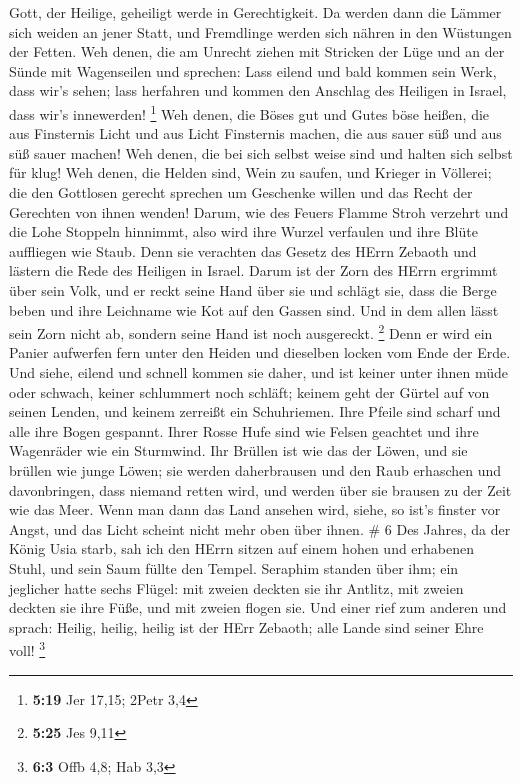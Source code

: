 Gott, der Heilige, geheiligt werde in Gerechtigkeit.  Da
werden dann die Lämmer sich weiden an jener Statt, und Fremdlinge werden
sich nähren in den Wüstungen der Fetten.  Weh denen, die am
Unrecht ziehen mit Stricken der Lüge und an der Sünde mit Wagenseilen
 und sprechen: Lass eilend und bald kommen sein Werk, dass
wir's sehen; lass herfahren und kommen den Anschlag des Heiligen in
Israel, dass wir's innewerden! \footnote{\textbf{5:19} Jer 17,15; 2Petr
  3,4}  Weh denen, die Böses gut und Gutes böse heißen, die
aus Finsternis Licht und aus Licht Finsternis machen, die aus sauer süß
und aus süß sauer machen!  Weh denen, die bei sich selbst
weise sind und halten sich selbst für klug!  Weh denen, die
Helden sind, Wein zu saufen, und Krieger in Völlerei;  die
den Gottlosen gerecht sprechen um Geschenke willen und das Recht der
Gerechten von ihnen wenden!  Darum, wie des Feuers Flamme
Stroh verzehrt und die Lohe Stoppeln hinnimmt, also wird ihre Wurzel
verfaulen und ihre Blüte auffliegen wie Staub. Denn sie verachten das
Gesetz des HErrn Zebaoth und lästern die Rede des Heiligen in Israel.
 Darum ist der Zorn des HErrn ergrimmt über sein Volk, und
er reckt seine Hand über sie und schlägt sie, dass die Berge beben und
ihre Leichname wie Kot auf den Gassen sind. Und in dem allen lässt sein
Zorn nicht ab, sondern seine Hand ist noch ausgereckt. \footnote{\textbf{5:25}
  Jes 9,11}  Denn er wird ein Panier aufwerfen fern unter
den Heiden und dieselben locken vom Ende der Erde. Und siehe, eilend und
schnell kommen sie daher,  und ist keiner unter ihnen müde
oder schwach, keiner schlummert noch schläft; keinem geht der Gürtel auf
von seinen Lenden, und keinem zerreißt ein Schuhriemen. 
Ihre Pfeile sind scharf und alle ihre Bogen gespannt. Ihrer Rosse Hufe
sind wie Felsen geachtet und ihre Wagenräder wie ein Sturmwind.
 Ihr Brüllen ist wie das der Löwen, und sie brüllen wie
junge Löwen; sie werden daherbrausen und den Raub erhaschen und
davonbringen, dass niemand retten wird,  und werden über
sie brausen zu der Zeit wie das Meer. Wenn man dann das Land ansehen
wird, siehe, so ist's finster vor Angst, und das Licht scheint nicht
mehr oben über ihnen. \# 6  Des Jahres, da der König Usia
starb, sah ich den HErrn sitzen auf einem hohen und erhabenen Stuhl, und
sein Saum füllte den Tempel.  Seraphim standen über ihm; ein
jeglicher hatte sechs Flügel: mit zweien deckten sie ihr Antlitz, mit
zweien deckten sie ihre Füße, und mit zweien flogen sie. 
Und einer rief zum anderen und sprach: Heilig, heilig, heilig ist der
HErr Zebaoth; alle Lande sind seiner Ehre voll! \footnote{\textbf{6:3}
  Offb 4,8; Hab 3,3}

